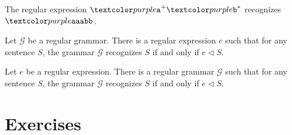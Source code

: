 \begin{example}
  The regular expression $\bnft{a}^+ \bnft{b}^*$ recognizes $\bnft{aaabb}$.
  \begin{prooftree}
  \end{prooftree}
\end{example}

\begin{theorem}
  Let $\mathcal G$ be a regular grammar.
  There is a regular expression $e$ such that for any sentence $S$, the grammar $\mathcal G$ recognizes $S$ if and only if $e \triangleleft S$.
\end{theorem}

\begin{theorem}
  Let $e$ be a regular expression.
  There is a regular grammar $\mathcal G$ such that for any sentence $S$, the grammar $\mathcal G$ recognizes $S$ if and only if $e \triangleleft S$.
\end{theorem}



\section{Exercises}
